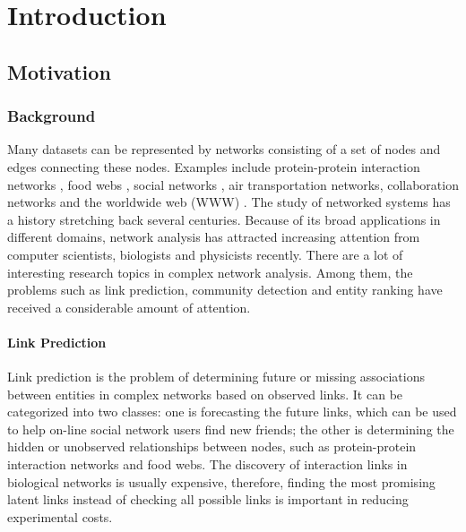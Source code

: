 \documentclass[\main/thesis.tex]{subfiles}
\begin{document}
\chapter{Introduction}

\section{Motivation}
\subsection{Background} \label{background}
Many datasets can be represented by networks consisting of a set of nodes and edges connecting these nodes. Examples include protein-protein interaction networks \cite{krogan2006global}, food webs \cite{williams2000simple}, social networks \cite{shetty2004enron}, air transportation networks, collaboration networks \cite{nascimento2003analysis,leskovec2007graph} and the worldwide web (WWW) \cite{albert1999internet,broder2000graph}. The study of networked systems has a history stretching back several centuries. Because of its broad applications in different domains, network analysis has attracted increasing attention from computer scientists, biologists and physicists recently. There are a lot of interesting research topics in complex network analysis. Among them, the problems such as link prediction, community detection and entity ranking have received a considerable amount of attention.

\subsubsection{Link Prediction}
Link prediction is the problem of determining future or missing associations between entities in complex networks based on observed links. It can be categorized into two classes: one is forecasting the future links, which can be used to help on-line social network users find new friends; the other is determining the hidden or unobserved relationships between nodes, such as protein-protein interaction networks and food webs. The discovery of interaction links in biological networks is usually expensive, therefore, finding the most promising latent links instead of checking all possible links is important in reducing experimental costs.
\end{document}
